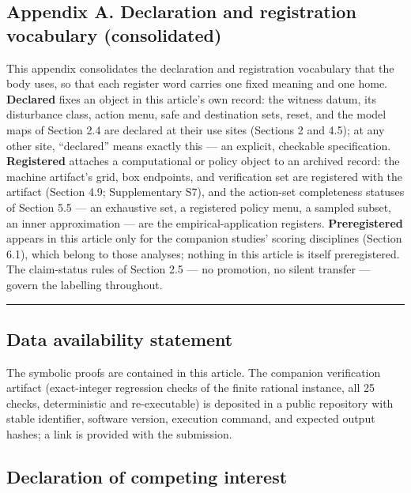 \documentclass[11pt]{article}
\begin{document}
\subsection{Appendix A. Declaration and registration vocabulary
(consolidated)}\label{appendix-a.-declaration-and-registration-vocabulary-consolidated}

This appendix consolidates the declaration and registration vocabulary
that the body uses, so that each register word carries one fixed meaning
and one home. \textbf{Declared} fixes an object in this article's own
record: the witness datum, its disturbance class, action menu, safe and
destination sets, reset, and the model maps of Section 2.4 are declared
at their use sites (Sections 2 and 4.5); at any other site, ``declared''
means exactly this --- an explicit, checkable specification.
\textbf{Registered} attaches a computational or policy object to an
archived record: the machine artifact's grid, box endpoints, and
verification set are registered with the artifact (Section 4.9;
Supplementary S7), and the action-set completeness statuses of Section
5.5 --- an exhaustive set, a registered policy menu, a sampled subset,
an inner approximation --- are the empirical-application registers.
\textbf{Preregistered} appears in this article only for the companion
studies' scoring disciplines (Section 6.1), which belong to those
analyses; nothing in this article is itself preregistered. The
claim-status rules of Section 2.5 --- no promotion, no silent transfer
--- govern the labelling throughout.

\begin{center}\rule{0.5\linewidth}{0.5pt}\end{center}

\subsection{Data availability
statement}\label{data-availability-statement}

The symbolic proofs are contained in this article. The companion
verification artifact (exact-integer regression checks of the finite
rational instance, all 25 checks, deterministic and re-executable) is
deposited in a public repository with stable identifier, software
version, execution command, and expected output hashes; a link is
provided with the submission.

\subsection{Declaration of competing
interest}\label{declaration-of-competing-interest}
\end{document}
